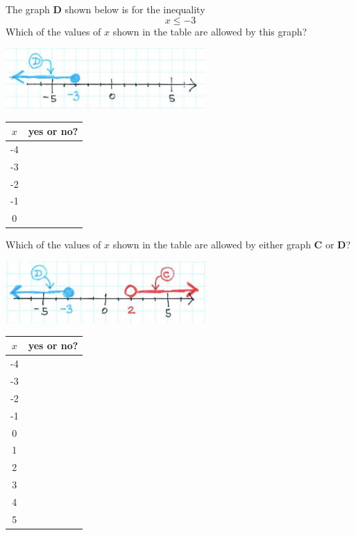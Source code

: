 \begin{myExample}{
    The graph {\sffamily\bfseries D} shown below is for the inequality 
    \[
        x \leq -3
    \]
    Which of the values of $x$ shown in the table are allowed by this graph?
}
    \begin{center}
        \includegraphics[width=3in]{or-2.jpg}
        
        \Large
        \begin{tabular}{c|c}
            $x$ & yes or no? \\
            \toprule
            -4& \\
            -3& \\
            -2& \\
            -1& \\
            0& \\
            \bottomrule
        \end{tabular}
    \end{center}
\end{myExample}



\begin{myExample}{
    Which of the values of $x$ shown in the table are allowed by 
    either graph {\sffamily\bfseries C} or {\sffamily\bfseries D}?
}
    \begin{center}
        \includegraphics[width=3in]{or-3.jpg}
        
        \Large
        \begin{tabular}{c|c}
            $x$ & yes or no? \\
            \toprule
            -4& \\
            -3& \\
            -2& \\
            -1& \\
            0& \\
            1& \\
            2& \\
            3& \\
            4& \\
            5& \\
            \bottomrule
        \end{tabular}
    \end{center}
\end{myExample}



